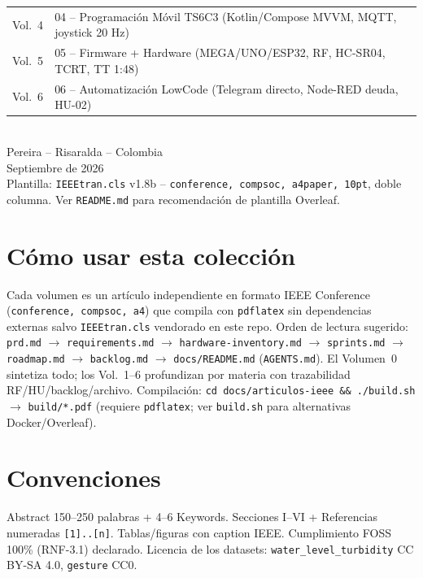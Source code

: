 \documentclass[a4paper,12pt]{article}
\begin{document}
\begin{center}
\begin{tabular}{@{}ll@{}}
Vol.~4 & 04 -- Programación Móvil TS6C3 (Kotlin/Compose MVVM, MQTT, joystick 20 Hz)\\
Vol.~5 & 05 -- Firmware + Hardware (MEGA/UNO/ESP32, RF, HC-SR04, TCRT, TT 1:48)\\
Vol.~6 & 06 -- Automatización LowCode (Telegram directo, Node-RED deuda, HU-02)\\
\bottomrule
\end{tabular}\\[10mm]
{\small Pereira -- Risaralda -- Colombia}\\
{\small Septiembre de 2026}\\[4mm]
{\footnotesize Plantilla: \texttt{IEEEtran.cls} v1.8b -- \texttt{conference, compsoc, a4paper, 10pt}, doble columna. Ver \texttt{README.md} para recomendación de plantilla Overleaf.}\\
\end{center}
\newpage
\section*{Cómo usar esta colección}
Cada volumen es un artículo independiente en formato IEEE Conference (\texttt{conference, compsoc, a4}) que compila con \texttt{pdflatex} sin dependencias externas salvo \texttt{IEEEtran.cls} vendorado en este repo. Orden de lectura sugerido: \texttt{prd.md} $\rightarrow$ \texttt{requirements.md} $\rightarrow$ \texttt{hardware-inventory.md} $\rightarrow$ \texttt{sprints.md} $\rightarrow$ \texttt{roadmap.md} $\rightarrow$ \texttt{backlog.md} $\rightarrow$ \texttt{docs/README.md} (\texttt{AGENTS.md}). El Volumen~0 sintetiza todo; los Vol.~1--6 profundizan por materia con trazabilidad RF/HU/backlog/archivo. Compilación: \texttt{cd docs/articulos-ieee \&\& ./build.sh} $\rightarrow$ \texttt{build/*.pdf} (requiere \texttt{pdflatex}; ver \texttt{build.sh} para alternativas Docker/Overleaf).

\section*{Convenciones}
Abstract 150--250 palabras + 4--6 Keywords. Secciones I--VI + Referencias numeradas \texttt{[1]..[n]}. Tablas/figuras con caption IEEE. Cumplimiento FOSS 100\% (RNF-3.1) declarado. Licencia de los datasets: \texttt{water\_level\_turbidity} CC BY-SA 4.0, \texttt{gesture} CC0.
\end{document}
